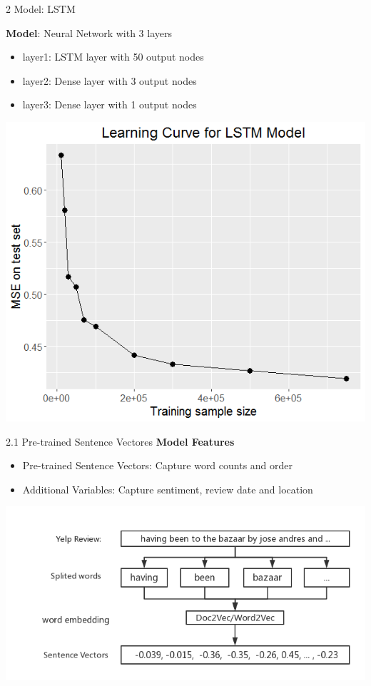 \documentclass[10pt]{beamer}
\begin{document}
\begin{frame}{2 Model: LSTM}

\textbf{Model}: Neural Network with 3 layers\\
\begin{itemize}
	\item layer1: LSTM layer with 50 output nodes
	\item layer2: Dense layer with 3 output nodes
	\item layer3: Dense layer with 1 output nodes
\end{itemize}

\centering
\includegraphics[scale=0.4]{../image/learning_curve.png}


\end{frame}




\begin{frame}{2.1 Pre-trained Sentence Vectores}
\textbf{Model Features}
\begin{itemize}
	\item Pre-trained Sentence Vectors: Capture word counts and order
	\item Additional  Variables: Capture sentiment, review date and location
\end{itemize}
\centering
\includegraphics[scale=0.4]{../image/embedding.png}


\end{frame}
\end{document}

